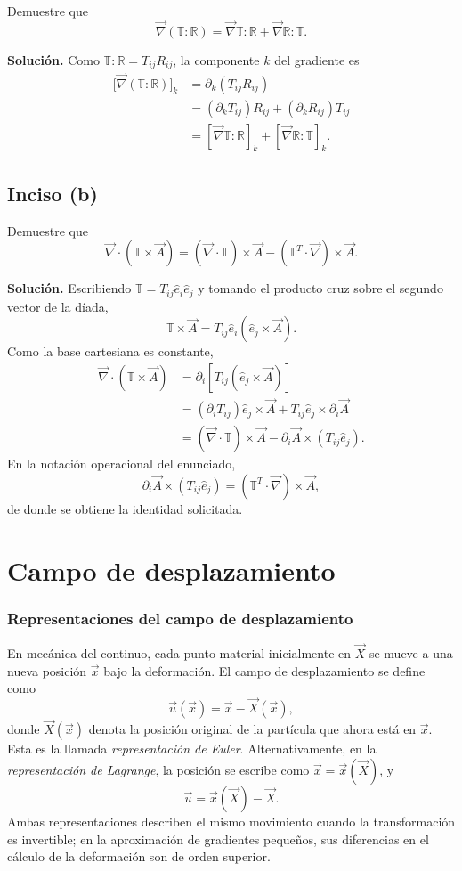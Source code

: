 Demuestre que
\[
\vec\nabla(\mathbb T:\mathbb R)
=\vec\nabla\mathbb T:\mathbb R
+\vec\nabla\mathbb R:\mathbb T.
\]

\textbf{Solución.} Como $\mathbb T:\mathbb R=T_{ij}R_{ij}$, la componente $k$ del gradiente es
\[
\begin{aligned}
\bigl[\vec\nabla(\mathbb T:\mathbb R)\bigr]_k
&=\partial_k(T_{ij}R_{ij})\\
&=(\partial_kT_{ij})R_{ij}
  +(\partial_kR_{ij})T_{ij}\\
&=[\vec\nabla\mathbb T:\mathbb R]_k
  +[\vec\nabla\mathbb R:\mathbb T]_k.
\end{aligned}
\]

\subsection*{Inciso (b)}

Demuestre que
\[
\vec\nabla\cdot(\mathbb T\times\vec A)
=(\vec\nabla\cdot\mathbb T)\times\vec A
-(\mathbb T^T\cdot\vec\nabla)\times\vec A.
\]

\textbf{Solución.} Escribiendo
$\mathbb T=T_{ij}\hat e_i\hat e_j$ y tomando el producto cruz sobre el segundo vector de la díada,
\[
\mathbb T\times\vec A
=T_{ij}\hat e_i(\hat e_j\times\vec A).
\]
Como la base cartesiana es constante,
\[
\begin{aligned}
\vec\nabla\cdot(\mathbb T\times\vec A)
&=\partial_i\left[T_{ij}(\hat e_j\times\vec A)\right]\\
&=(\partial_iT_{ij})\hat e_j\times\vec A
  +T_{ij}\hat e_j\times\partial_i\vec A\\
&=(\vec\nabla\cdot\mathbb T)\times\vec A
  -\partial_i\vec A\times(T_{ij}\hat e_j).
\end{aligned}
\]
En la notación operacional del enunciado,
\[
\partial_i\vec A\times(T_{ij}\hat e_j)
= (\mathbb T^T\cdot\vec\nabla)\times\vec A,
\]
de donde se obtiene la identidad solicitada.

\section{Campo de desplazamiento}

\subsubsection{Representaciones del campo de desplazamiento}

En mecánica del continuo, cada punto material inicialmente en $\vec{X}$ se mueve a una nueva posición $\vec{x}$ bajo la deformación. El campo de desplazamiento se define como
\[ \vec{u}(\vec{x}) = \vec{x} - \vec{X}(\vec{x}), \]
donde $\vec{X}(\vec{x})$ denota la posición original de la partícula que ahora está en $\vec{x}$. Esta es la llamada \emph{representación de Euler}. Alternativamente, en la \emph{representación de Lagrange}, la posición se escribe como $\vec{x} = \vec{x}(\vec{X})$, y
\[ \vec{u} = \vec{x}(\vec{X}) - \vec{X}. \]
Ambas representaciones describen el mismo movimiento cuando la transformación es invertible; en la aproximación de gradientes pequeños, sus diferencias en el cálculo de la deformación son de orden superior.

